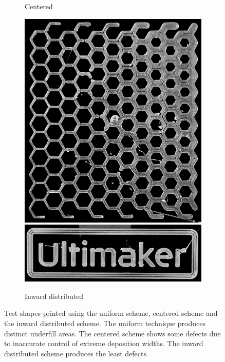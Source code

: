 {\begin{figure}
\begin{subfigure}{\figwidth}
\caption{Centered}\label{print_center}
\end{subfigure}
\begin{subfigure}{\figwidth}\centering
\includegraphics[height=\figheight]{sources-applications-P3-print-hex-inward-edited.png}
\includegraphics[width=\figwidth]{sources-applications-P3-print-UM-inward-edited.png}
\caption{Inward distributed}\label{print_inward}
\end{subfigure}
\caption{
Test shapes printed using the uniform scheme, centered scheme and the inward distributed scheme.
The uniform technique produces distinct underfill areas.
The centered scheme shows some defects due to inaccurate control of extreme deposition widths.
The inward distributed scheme produces the least defects.
}
\label{prints}
\end{figure}
}{}












